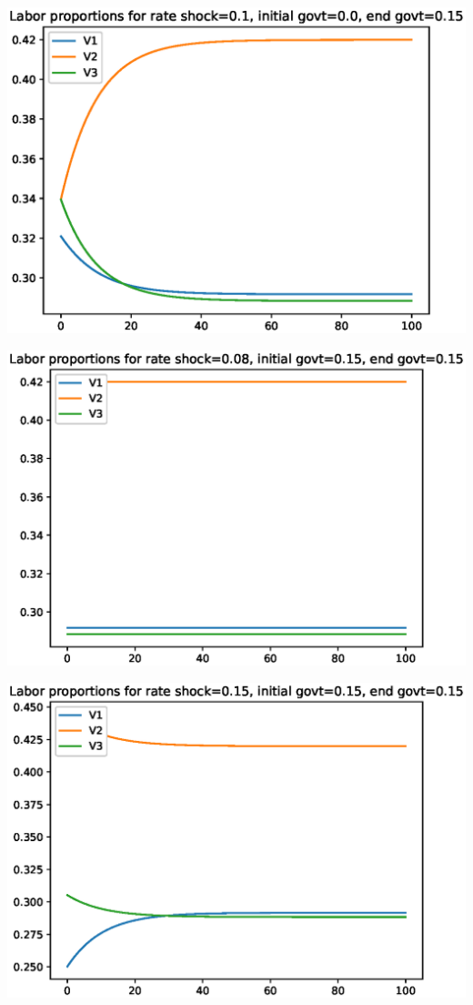 \documentclass[12pt]{article}
\theoremstyle{definition}
\begin{document}
\begin{minipage}{\linewidth}
\begin{framed}
\begin{minipage}[t]{.48\textwidth}
\end{minipage}\hfill
\begin{minipage}[t]{.48\textwidth}
\centering
\includegraphics[width=1\textwidth]{images/econ_0_run_3_labor}
\end{minipage} \hfill
\begin{minipage}[t]{.48\textwidth}
\centering
\includegraphics[width=1\textwidth]{images/econ_0_run_4_labor}
\end{minipage}\hfill
\begin{minipage}[t]{.48\textwidth}
\centering
\includegraphics[width=1\textwidth]{images/econ_0_run_5_labor}

\end{minipage}
\end{framed}
\end{minipage}
\end{document}
